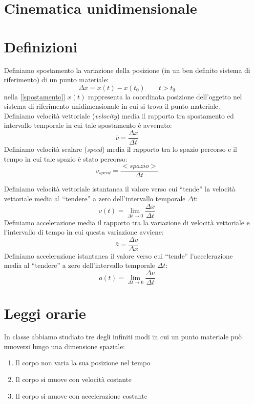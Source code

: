 \documentclass[a4paper,10pt,oneside]{article}
\begin{document}
\section*{Cinematica unidimensionale}


\section*{Definizioni}

Definiamo spostamento la variazione della posizione (in un ben definito sistema di riferimento) di un punto materiale:
\begin{equation}\label{spostamento}
\Delta x=x(t)-x(t_0)\qquad t>t_0
\end{equation}
nella [\ref{spostamento}] $x(t)$ rappresenta la coordinata posizione dell'oggetto nel sistema di riferimento unidimensionale in cui si trova il punto materiale.
Definiamo velocità vettoriale (\emph{velocity}) media il rapporto tra spostamento ed intervallo temporale in cui tale spostamento è avvenuto:
\begin{equation}\label{vmedia}
 \bar{v}=\frac{\Delta x}{\Delta t}
\end{equation}
Definiamo velocità scalare (\emph{speed}) media il rapporto tra lo spazio percorso e il tempo in cui tale spazio è stato percorso:
\begin{equation}
 v_{speed}=\frac{<spazio>}{\Delta t}
\end{equation}

Definiamo velocità vettoriale istantanea il valore verso cui ``tende'' la velocità vettoriale media al ``tendere'' a zero dell'intervallo temporale $\Delta t$:
\begin{equation}
 v(t)=\lim_{\Delta t \to 0} \frac{\Delta x}{\Delta t}
\end{equation}
Definiamo accelerazione media il rapporto tra la variazione di velocità vettoriale e l'intervallo di tempo in cui questa variazione avviene:
\begin{equation}\label{amedia}
 \bar{a}=\frac{\Delta v}{\Delta x}
\end{equation}
Definiamo accelerazione istantanea il valore verso cui ``tende'' l'accelerazione media al ``tendere'' a zero dell'intervallo temporale $\Delta t$:
\begin{equation}
 a(t)=\lim_{\Delta t \to 0}\frac{\Delta v}{\Delta t}
\end{equation}
\section*{Leggi orarie}
In classe abbiamo studiato tre degli infiniti modi in cui un punto  materiale può muoversi lungo una dimensione spaziale:
\begin{enumerate}
 \item Il corpo non varia la sua posizione nel tempo
 \item Il corpo si muove con velocità costante
 \item Il corpo si muove con accelerazione costante
\end{enumerate}
\end{document}
